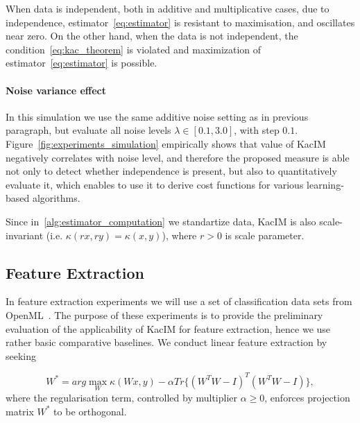 \documentclass{article}
\begin{document}
When data is independent, both in additive and multiplicative cases, due to independence, estimator~\eqref{eq:estimator} is resistant to maximisation, and oscillates near zero. On the other hand, when the data is not independent, the condition~\eqref{eq:kac_theorem} is violated and maximization of estimator~\eqref{eq:estimator} is possible.
\paragraph{Noise variance effect} In this simulation we use the same additive noise setting as in previous paragraph, but evaluate all noise levels $\lambda \in [0.1, 3.0]$, with step $0.1$.
Figure~\ref{fig:experiments_simulation} empirically shows that value of KacIM  negatively correlates with noise level, and therefore the proposed measure is able not only to detect whether independence is present, but also to quantitatively evaluate it, which enables to use it to derive cost functions for various learning-based algorithms. 

Since in~\ref{alg:estimator_computation} we standartize data, KacIM is also scale-invariant (i.e. $\kappa(rx, ry) = \kappa(x,y)$), where $r>0$ is scale parameter.





\subsection{Feature Extraction}
In feature extraction experiments we will use a set of classification data sets from OpenML~\cite{OpenML2013}. The purpose of these experiments is to provide the preliminary evaluation of the applicability of KacIM for feature extraction, hence we use rather basic comparative baselines. We conduct linear feature extraction by seeking 

\begin{equation}
\label{eq:kim_feature_extraction}    
W^{*} = arg \max_{W} \kappa(Wx, y) - \alpha Tr\{(W^{T}W-I)^{T}(W^{T}W-I) \},
\end{equation}
where the regularisation term, controlled by multiplier $\alpha \geq 0$, enforces projection matrix $W^{*}$ to be orthogonal.

\end{document}
